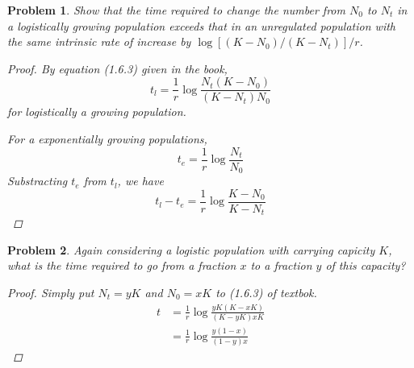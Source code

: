 \documentclass[12pt]{report}
\newtheorem{problem}{Problem}[chapter]
\begin{document}
        \begin{problem}
            Show that the time required to change the number from $N_0$ to $N_t$ in a logistically growing population exceeds that in an unregulated population with the same intrinsic rate of increase by $\log[(K-N_0)/(K-N_t)]/r$.
            \begin{proof}
                By equation (1.6.3) given in the book,
                \begin{equation*}
                    t_l = \frac{1}{r} \log \frac{N_t(K-N_0)}{(K-N_t)N_0}
                \end{equation*}
                for logistically a growing population.

                For a exponentially growing populations,
                \begin{equation*}
                    t_e = \frac{1}{r} \log \frac{N_t}{N_0}
                \end{equation*}
                Substracting $t_e$ from $t_l$, we have
                \begin{equation*}
                    t_l - t_e = \frac{1}{r} \log \frac{K-N_0}{K-N_t}
                \end{equation*}
            \end{proof}
        \end{problem}


        \begin{problem}
            Again considering a logistic population with carrying capicity $K$, what is the time required to go from a fraction $x$ to a fraction $y$ of this capacity?
            \begin{proof}
                Simply put $N_t = yK$ and $N_0 = xK$ to (1.6.3) of textbok.
                \begin{equation*}
                    \begin{split}
                        t &= \frac{1}{r} \log \frac{yK(K-xK)}{(K-yK)xK} \\
                        &= \frac{1}{r} \log \frac{y(1-x)}{(1-y)x}
                    \end{split}
                \end{equation*}
            \end{proof}
        \end{problem}
\end{document}
